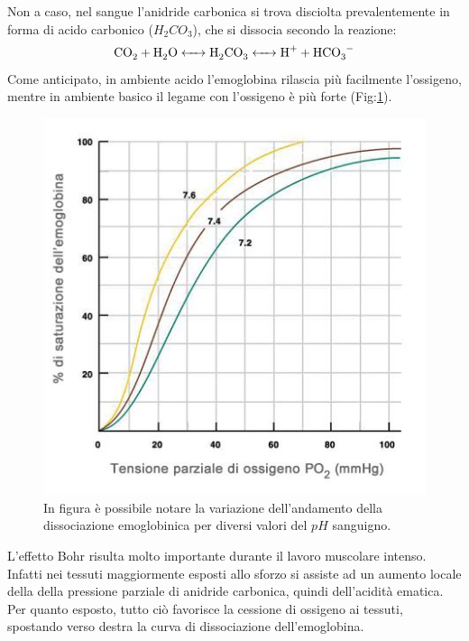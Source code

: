 \documentclass[12pt,a4paper, twoside, openright]{report}
\begin{document}
Non a caso, nel sangue l'anidride carbonica si trova disciolta prevalentemente in forma di acido carbonico ($H_2CO_3$), che si dissocia secondo la reazione:
\begin{equation*}
    \ce{CO_2 + H_2O <-> H_2CO_3 <-> H^+ + HCO_3^-}
\end{equation*}
Come anticipato, in ambiente acido l'emoglobina rilascia più facilmente l'ossigeno, mentre in ambiente basico il legame con l'ossigeno è più forte (Fig:\ref{fig:pH}).
\begin{figure}[h!]
    \centering
    \includegraphics[width=\textwidth]{emoglobina-pH.jpeg}
    \caption{In figura è possibile notare la variazione dell'andamento della 							 dissociazione emoglobinica per diversi valori del $pH$ sanguigno.}
    \label{fig:pH}
\end{figure}
L'effetto Bohr risulta molto importante durante il lavoro muscolare intenso. 
Infatti nei tessuti maggiormente esposti allo sforzo si assiste ad un aumento locale della della pressione parziale di anidride carbonica, quindi dell'acidità ematica. 
Per quanto esposto, tutto ciò favorisce la cessione di ossigeno ai tessuti, spostando verso destra la curva di dissociazione dell'emoglobina.
\newline
\end{document}
